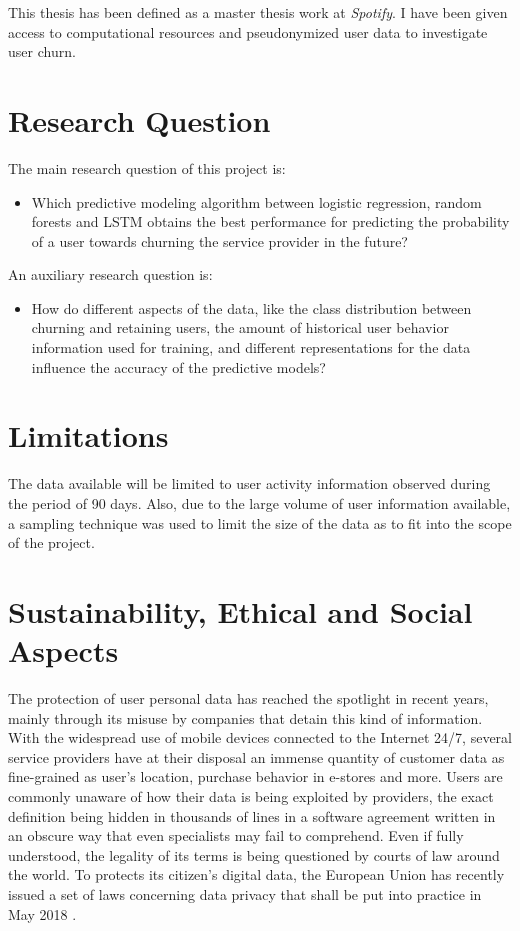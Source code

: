 \documentclass{kththesis}
\begin{document}
	This thesis has been defined as a master thesis work at \emph{Spotify}. I have been given access to computational resources and pseudonymized user data to investigate user churn.
      
\section{Research Question}	
	
The main research question of this project is:

\begin{itemize}
\item Which predictive modeling algorithm between logistic regression, random forests and LSTM obtains the best performance for predicting the probability of a user towards churning the service provider in the future?
\end{itemize}	

An auxiliary research question is:

\begin{itemize}
\item How do different aspects of the data, like the class distribution between churning and retaining users, the amount of historical user behavior information used for training, and different representations for the data influence the accuracy of the predictive models?
\end{itemize}

\section{Limitations}

The data available will be limited to user activity information observed during the period of 90 days. Also, due to the large volume of user information available, a sampling technique was used to limit the size of the data as to fit into the scope of the project.

\section{Sustainability, Ethical and Social Aspects}

The protection of user personal data has reached the spotlight in recent years, mainly through its misuse by companies that detain this kind of information. With the widespread use of mobile devices connected to the Internet 24/7, several service providers have at their disposal an immense quantity of customer data as fine-grained as user's location, purchase behavior in e-stores and more. Users are commonly unaware of how their data is being exploited by providers, the exact definition being hidden in thousands of lines in a software agreement written in an obscure way that even specialists may fail to comprehend. Even if fully understood, the legality of its terms is being questioned by courts of law around the world. To protects its citizen's digital data, the European Union has recently issued a set of laws concerning data privacy that shall be put into practice in May 2018 \citep{eu2017protection}.
\end{document}
